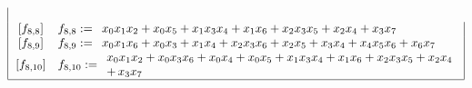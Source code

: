 \documentclass[pdf,sprung,slideColor,nocolorBG]{beamer}
\begin{document}
\begin{frame}
\begin{align*}
\begin{array}{|cl|}
\\
\,[f_{ 8 , 8 }] & f_{ 8 , 8 } :=
\begin{array}{l}
x_{0} x_{1} x_{2} + x_{0} x_{5} + x_{1} x_{3} x_{4} + x_{1} x_{6} + x_{2} x_{3} x_{5} + x_{2} x_{4} + x_{3} x_{7}
\end{array}
\\
\,[f_{ 8 , 9 }] & f_{ 8 , 9 } :=
\begin{array}{l}
x_{0} x_{1} x_{6} + x_{0} x_{3} + x_{1} x_{4} + x_{2} x_{3} x_{6} + x_{2} x_{5} + x_{3} x_{4} + x_{4} x_{5} x_{6} + x_{6} x_{7}
\end{array}
\\
\,[f_{ 8 , 10 }] & f_{ 8 , 10 } :=
\begin{array}{l}
x_{0} x_{1} x_{2} + x_{0} x_{3} x_{6} + x_{0} x_{4} + x_{0} x_{5} + x_{1} x_{3} x_{4} + x_{1} x_{6} + x_{2} x_{3} x_{5} + x_{2} x_{4} 
\\
+\,  x_{3} x_{7}
\end{array}
\\
\hline
\end{array}
\end{align*}
\normalsize{}
\end{frame}
\end{document}

